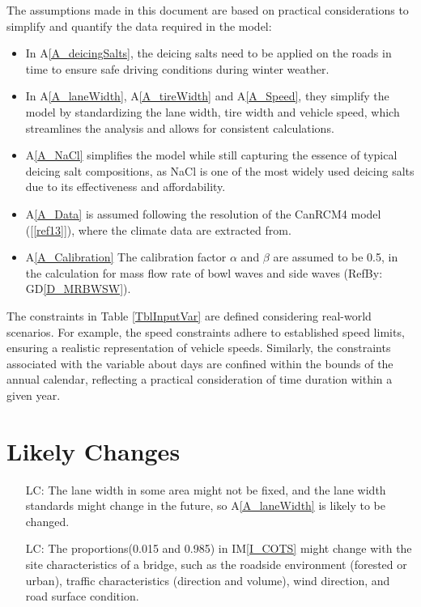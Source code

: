 \documentclass[12pt]{article}
\newcommand{\dref}[1]{GD\ref{#1}}
\newcommand{\aref}[1]{A\ref{#1}}
\newcommand{\iref}[1]{IM\ref{#1}}
\newcounter{lcnum} %
\newcommand{\reref}[1]{\ref{#1}}
\begin{document}
The assumptions made in this document are based on practical considerations to simplify and quantify the data required in the model:
\begin{itemize} 
\item In \aref{A_deicingSalts}, the deicing salts need to be applied on the roads in time to ensure safe driving conditions during winter weather. 
\item In \aref{A_laneWidth}, \aref{A_tireWidth} and \aref{A_Speed}, they simplify the model by standardizing the lane width, tire width and vehicle speed, which streamlines the analysis and allows for consistent calculations.
\item \aref{A_NaCl} simplifies the model while still capturing the essence of typical deicing salt compositions, as NaCl is one of the most widely used deicing salts due to its effectiveness and affordability.
\item \aref{A_Data} is assumed following the resolution of the CanRCM4 model ([\reref{ref13}]), where the climate data are extracted from.
\item \aref{A_Calibration} The calibration factor $\alpha$ and $\beta$ are assumed to be 0.5, in the calculation for mass flow rate of bowl waves and side waves (RefBy: \dref{D_MRBWSW}).

\end{itemize}

The constraints in Table \ref{TblInputVar} are defined considering real-world scenarios. For example,  the speed constraints adhere to established speed limits, ensuring a realistic representation of vehicle speeds. Similarly, the constraints associated with the variable about days are confined within the bounds of the annual calendar, reflecting a practical consideration of time duration within a given year.


\section{Likely Changes}    

\noindent \begin{itemize}

\item[LC\refstepcounter{lcnum}\thelcnum\label{LC_laneWidth}:] The lane width in some area might not be fixed, and the lane width standards might change in the future, so \aref{A_laneWidth} is likely to be changed. 
\item[LC\refstepcounter{lcnum}\thelcnum\label{LC_SASC}:] The proportions(0.015 and 0.985) in \iref{I_COTS} might change with the site characteristics of a bridge, such as the roadside environment (forested or urban), traffic characteristics (direction and volume), wind direction, and road surface condition. 

\end{itemize}
\end{document}
